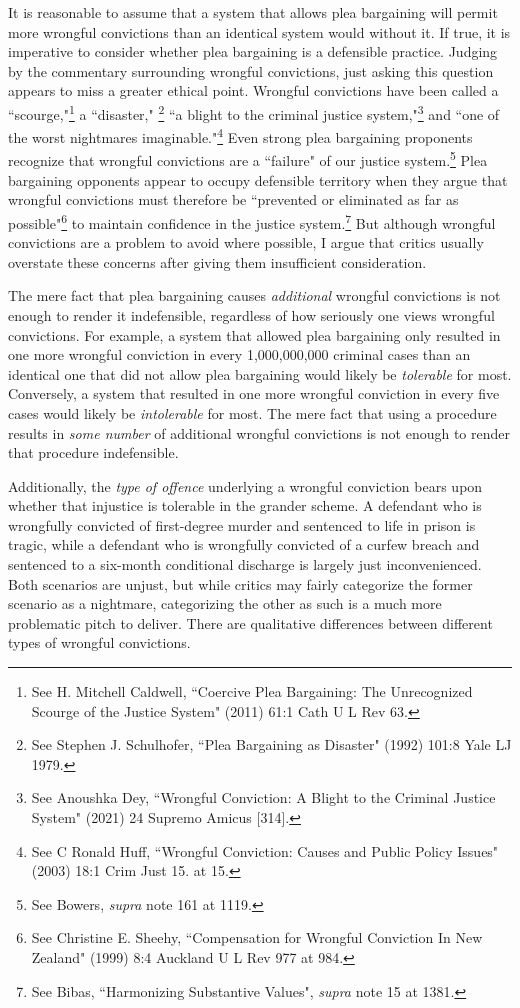 It is reasonable to assume that a system that allows plea bargaining will permit more wrongful convictions than an identical system would without it. If true, it is imperative to consider whether plea bargaining is a defensible practice. Judging by the commentary surrounding wrongful convictions, just asking this question appears to miss a greater ethical point. Wrongful convictions have been called a ``scourge,"\footnote{See H. Mitchell Caldwell, ``Coercive Plea Bargaining: The Unrecognized Scourge of the Justice System" (2011) 61:1 Cath U L Rev 63.} a ``disaster," \footnote{See Stephen J. Schulhofer, ``Plea Bargaining as Disaster" (1992) 101:8 Yale LJ 1979.} ``a blight to the criminal justice system,"\footnote{See Anoushka Dey, ``Wrongful Conviction: A Blight to the Criminal Justice System" (2021)
24 Supremo Amicus [314].} and ``one of the worst nightmares imaginable."\footnote{See C Ronald Huff, ``Wrongful Conviction: Causes and Public Policy Issues" (2003) 18:1 Crim Just 15. at 15.} Even strong plea bargaining proponents recognize that wrongful convictions are a ``failure" of our justice system.\footnote{See Bowers, \textit{supra} note 161 at 1119.} Plea bargaining opponents appear to occupy defensible territory when they argue that wrongful convictions must therefore be ``prevented or eliminated as far as possible"\footnote{See Christine E. Sheehy, ``Compensation for Wrongful Conviction In New Zealand" (1999) 8:4 Auckland U L Rev 977 at 984.} to maintain confidence in the justice system.\footnote{See Bibas, ``Harmonizing Substantive Values", \textit{supra} note 15 at 1381.} But although wrongful convictions are a problem to avoid where possible, I argue that critics usually overstate these concerns after giving them insufficient consideration.

The mere fact that plea bargaining causes \textit{additional} wrongful convictions is not enough to render it indefensible, regardless of how seriously one views wrongful convictions. For example, a system that allowed plea bargaining only resulted in one more wrongful conviction in every 1,000,000,000 criminal cases than an identical one that did not allow plea bargaining would likely be \textit{tolerable} for most. Conversely, a system that resulted in one more wrongful conviction in every five cases would likely be \textit{intolerable} for most. The mere fact that using a procedure results in \textit{some number} of additional wrongful convictions is not enough to render that procedure indefensible. 

Additionally, the \textit{type of offence} underlying a wrongful conviction bears upon whether that injustice is tolerable in the grander scheme. A defendant who is wrongfully convicted of first-degree murder and sentenced to life in prison is tragic, while a defendant who is wrongfully convicted of a curfew breach and sentenced to a six-month conditional discharge is largely just inconvenienced. Both scenarios are unjust, but while critics may fairly categorize the former scenario as a nightmare, categorizing the other as such is a much more problematic pitch to deliver. There are qualitative differences between different types of wrongful convictions.

